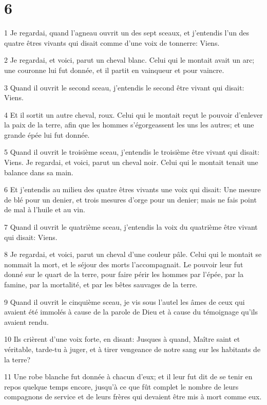 \chapter{6}

\par 1 Je regardai, quand l'agneau ouvrit un des sept sceaux, et j'entendis l'un des quatre êtres vivants qui disait comme d'une voix de tonnerre: Viens.
\par 2 Je regardai, et voici, parut un cheval blanc. Celui qui le montait avait un arc; une couronne lui fut donnée, et il partit en vainqueur et pour vaincre.
\par 3 Quand il ouvrit le second sceau, j'entendis le second être vivant qui disait: Viens.
\par 4 Et il sortit un autre cheval, roux. Celui qui le montait reçut le pouvoir d'enlever la paix de la terre, afin que les hommes s'égorgeassent les uns les autres; et une grande épée lui fut donnée.
\par 5 Quand il ouvrit le troisième sceau, j'entendis le troisième être vivant qui disait: Viens. Je regardai, et voici, parut un cheval noir. Celui qui le montait tenait une balance dans sa main.
\par 6 Et j'entendis au milieu des quatre êtres vivants une voix qui disait: Une mesure de blé pour un denier, et trois mesures d'orge pour un denier; mais ne fais point de mal à l'huile et au vin.
\par 7 Quand il ouvrit le quatrième sceau, j'entendis la voix du quatrième être vivant qui disait: Viens.
\par 8 Je regardai, et voici, parut un cheval d'une couleur pâle. Celui qui le montait se nommait la mort, et le séjour des morts l'accompagnait. Le pouvoir leur fut donné sur le quart de la terre, pour faire périr les hommes par l'épée, par la famine, par la mortalité, et par les bêtes sauvages de la terre.
\par 9 Quand il ouvrit le cinquième sceau, je vis sous l'autel les âmes de ceux qui avaient été immolés à cause de la parole de Dieu et à cause du témoignage qu'ils avaient rendu.
\par 10 Ils crièrent d'une voix forte, en disant: Jusques à quand, Maître saint et véritable, tarde-tu à juger, et à tirer vengeance de notre sang sur les habitants de la terre?
\par 11 Une robe blanche fut donnée à chacun d'eux; et il leur fut dit de se tenir en repos quelque temps encore, jusqu'à ce que fût complet le nombre de leurs compagnons de service et de leurs frères qui devaient être mis à mort comme eux.
